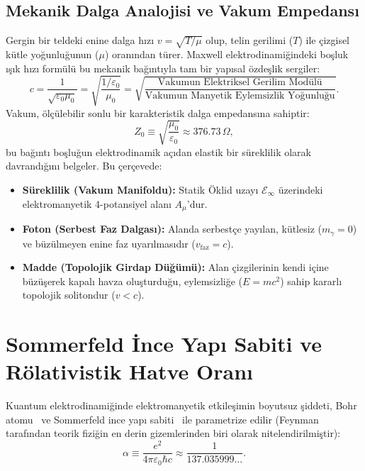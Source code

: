 \documentclass[11pt,a4paper]{article}
\begin{document}
\subsection{Mekanik Dalga Analojisi ve Vakum Empedansı}
\label{sec:tel_ve_dugum_paper2}

Gergin bir teldeki enine dalga hızı $v = \sqrt{T/\mu}$ olup, telin gerilimi ($T$) ile çizgisel kütle yoğunluğunun ($\mu$) oranından türer. Maxwell elektrodinamiğindeki boşluk ışık hızı formülü bu mekanik bağıntıyla tam bir yapısal özdeşlik sergiler:
\begin{equation}
    c = \frac{1}{\sqrt{\varepsilon_0 \mu_0}} = \sqrt{\frac{1/\varepsilon_0}{\mu_0}} = \sqrt{\frac{\text{Vakumun Elektriksel Gerilim Modülü}}{\text{Vakumun Manyetik Eylemsizlik Yoğunluğu}}}.
    \label{eq:vakum_tel_ozdeslik_p2}
\end{equation}
Vakum, ölçülebilir sonlu bir karakteristik dalga empedansına sahiptir:
\begin{equation}
    Z_0 \equiv \sqrt{\frac{\mu_0}{\varepsilon_0}} \approx 376.73\,\Omega,
    \label{eq:vakum_empedansi_tanim_p2}
\end{equation}
bu bağıntı boşluğun elektrodinamik açıdan elastik bir süreklilik olarak davrandığını belgeler. Bu çerçevede:
\begin{itemize}
    \item \textbf{Süreklilik (Vakum Manifoldu):} Statik Öklid uzayı $\mathcal{E}_\infty$ üzerindeki elektromanyetik 4-potansiyel alanı $A_\mu$'dur.
    \item \textbf{Foton (Serbest Faz Dalgası):} Alanda serbestçe yayılan, kütlesiz ($m_\gamma = 0$) ve büzülmeyen enine faz uyarılmasıdır ($v_{\mathrm{faz}} = c$).
    \item \textbf{Madde (Topolojik Girdap Düğümü):} Alan çizgilerinin kendi içine büzüşerek kapalı havza oluşturduğu, eylemsizliğe ($E = mc^2$) sahip kararlı topolojik solitondur ($v < c$).
\end{itemize}

\section{Sommerfeld İnce Yapı Sabiti ve Rölativistik Hatve Oranı}
\label{sec:ince_yapi}

Kuantum elektrodinamiğinde elektromanyetik etkileşimin boyutsuz şiddeti, Bohr atomu~\cite{bohr1913} ve Sommerfeld ince yapı sabiti~\cite{sommerfeld1916} ile parametrize edilir (Feynman~\cite{feynman1985} tarafından teorik fiziğin en derin gizemlerinden biri olarak nitelendirilmiştir):
\begin{equation}
    \alpha \equiv \frac{e^2}{4\pi \varepsilon_0 \hbar c} \approx \frac{1}{137.035999...}.
    \label{eq:alpha_tanim}
\end{equation}
\end{document}
